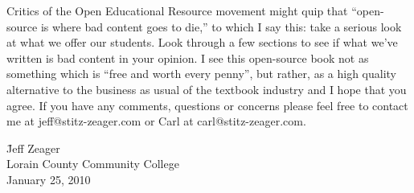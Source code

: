 \medskip 

\noindent  Critics of the Open Educational Resource movement might quip that ``open-source is where bad content goes to die,'' to which I say this: take a serious look at what we offer our students.  Look through a few sections to see if what we've written is bad content in your opinion.  I see this open-source book not as something which is ``free and worth every penny'', but rather, as a high quality alternative to the business as usual of the textbook industry and I hope that you agree.  If you have any comments, questions or concerns please feel free to contact me at jeff@stitz-zeager.com or Carl at carl@stitz-zeager.com.

\vspace{.5in}

\begin{tabbing}

\hspace{4in}   \= Jeff Zeager \\
               \> Lorain County Community College \\
               \> January 25, 2010
               
\end{tabbing}